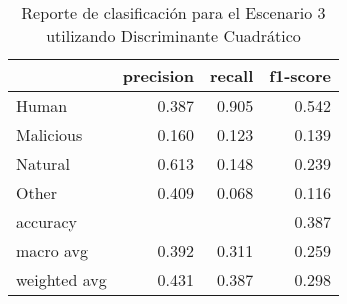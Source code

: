 \begin{table}
\centering
\caption{Reporte de clasificación para el Escenario 3 utilizando Discriminante Cuadrático}
\label{tab:DC_Escenario 3}
\begin{tabular}{lrrr}
\toprule
{} &  precision &  recall &  f1-score \\
\midrule
Human        &      0.387 &   0.905 &     0.542 \\
Malicious    &      0.160 &   0.123 &     0.139 \\
Natural      &      0.613 &   0.148 &     0.239 \\
Other        &      0.409 &   0.068 &     0.116 \\
accuracy     &            &         &     0.387 \\
macro avg    &      0.392 &   0.311 &     0.259 \\
weighted avg &      0.431 &   0.387 &     0.298 \\
\bottomrule
\end{tabular}
\end{table}
